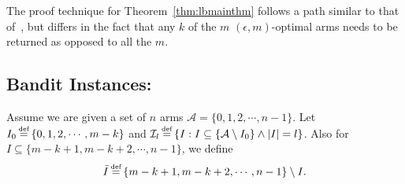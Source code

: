 


\thmlbmainthm*

The proof technique for Theorem~\ref{thm:lbmainthm} follows a path similar to
that of~\citep[Theorem 8]{bib:lucb}, but
differs in the fact that any $k$ of the $m$ $(\epsilon, m)$-optimal arms
 needs to be returned as opposed to all the $m$. 

\subsection{Bandit Instances:}
Assume we are given a set of $n$ arms $\mathcal{A} = \{0, 1, 2, \cdots, n-1\}$.
Let $I_0 \defeq \{0, 1, 2, \cdots, m-k\}$ and
$\I_l \defeq \{I : I\subseteq \{\mathcal{A}\setminus I_0\} \wedge |I| = l\}$.
Also for $I \subseteq \{m-k+1, m-k+2,\cdots,n-1\}$, we define $$\bar{I} \defeq \{m-k+1, m-k+2,\cdots,n-1\} \setminus I.$$

